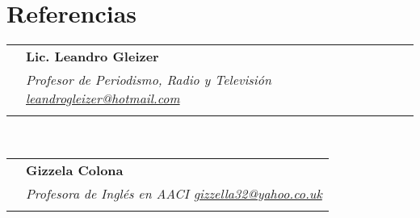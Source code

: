 \documentclass[a4paper,10pt]{article}
\newcommand{\dateEntry}[4]{
\begin{tabular}{p{1.7cm}|p{11cm}}
\raggedleft \textsc{#1} & #3 \\
\raggedleft \textsc{#2} & \footnotesize{#4}\\
\multicolumn{2}{c}{}\ %
\end{tabular}
}
\newcommand{\resEntryD}[2]{
\begin{tabular}{p{1.7cm}|p{11cm}}
& #1 \\
& \emph{#2} \\
\multicolumn{2}{c}{}\
\end{tabular}
}
\begin{document}

\section{Referencias}
\resEntryD{\textbf{Lic. Leandro Gleizer}}%
{Profesor de Periodismo, Radio y Televisión \newline
\href{mailto:leandrogleizer@hotmail.com}{leandrogleizer@hotmail.com}}\\

\resEntryD{\textbf{Gizzela Colona}}%
{Profesora de Inglés en AACI  \newline
\href{mailto:gizzella32@yahoo.co.uk}{gizzella32@yahoo.co.uk}}\\
\end{document}
